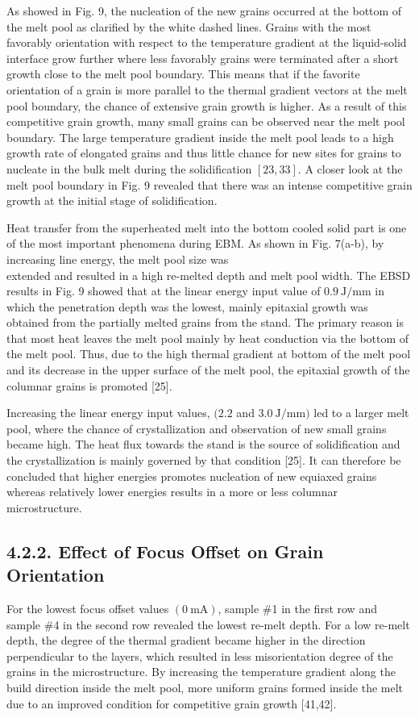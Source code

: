 \documentclass[10pt]{article}
\begin{document}
As showed in Fig. 9, the nucleation of the new grains occurred at the bottom of the melt pool as clarified by the white dashed lines. Grains with the most favorably orientation with respect to the temperature gradient at the liquid-solid interface grow further where less favorably grains were terminated after a short growth close to the melt pool boundary. This means that if the favorite orientation of a grain is more parallel to the thermal gradient vectors at the melt pool boundary, the chance of extensive grain growth is higher. As a result of this competitive grain growth, many small grains can be observed near the melt pool boundary. The large temperature gradient inside the melt pool leads to a high growth rate of elongated grains and thus little chance for new sites for grains to nucleate in the bulk melt during the solidification $[23,33]$. A closer look at the melt pool boundary in Fig. 9 revealed that there was an intense competitive grain growth at the initial stage of solidification.

Heat transfer from the superheated melt into the bottom cooled solid part is one of the most important phenomena during EBM. As shown in Fig. 7(a-b), by increasing line energy, the melt pool size was\\
extended and resulted in a high re-melted depth and melt pool width. The EBSD results in Fig. 9 showed that at the linear energy input value of $0.9 \mathrm{~J} / \mathrm{mm}$ in which the penetration depth was the lowest, mainly epitaxial growth was obtained from the partially melted grains from the stand. The primary reason is that most heat leaves the melt pool mainly by heat conduction via the bottom of the melt pool. Thus, due to the high thermal gradient at bottom of the melt pool and its decrease in the upper surface of the melt pool, the epitaxial growth of the columnar grains is promoted [25].

Increasing the linear energy input values, $(2.2$ and $3.0 \mathrm{~J} / \mathrm{mm})$ led to a larger melt pool, where the chance of crystallization and observation of new small grains became high. The heat flux towards the stand is the source of solidification and the crystallization is mainly governed by that condition [25]. It can therefore be concluded that higher energies promotes nucleation of new equiaxed grains whereas relatively lower energies results in a more or less columnar microstructure.

\subsection*{4.2.2. Effect of Focus Offset on Grain Orientation}
For the lowest focus offset values $(0 \mathrm{~mA})$, sample \#1 in the first row and sample \#4 in the second row revealed the lowest re-melt depth. For a low re-melt depth, the degree of the thermal gradient became higher in the direction perpendicular to the layers, which resulted in less misorientation degree of the grains in the microstructure. By increasing the temperature gradient along the build direction inside the melt pool, more uniform grains formed inside the melt due to an improved condition for competitive grain growth [41,42].
\end{document}
